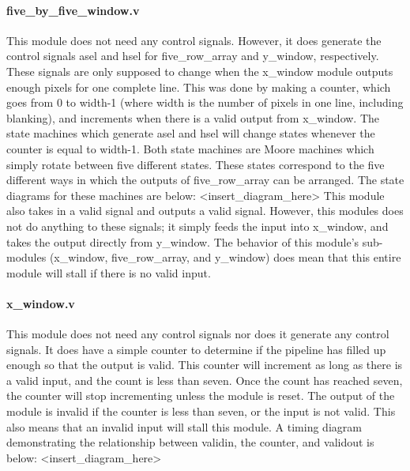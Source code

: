 \documentclass[12pt]{article}
\begin{document}
\paragraph{five\_by\_five\_window.v}
This module does not need any control signals. However, it does generate the 
control signals asel and hsel for five\_row\_array and y\_window, respectively. 
These signals are only supposed to change when the x\_window module outputs 
enough pixels for one complete line. This was done by making a counter, which 
goes from 0 to width-1 (where width is the number of pixels in one line, 
including blanking), and increments when there is a valid output from x\_window. 
The state machines which generate asel and hsel will change states whenever the 
counter is equal to width-1. Both state machines are Moore machines which simply 
rotate between five different states. These states correspond to the five 
different ways in which the outputs of five\_row\_array can be arranged. The state 
diagrams for these machines are below: <insert\_diagram\_here>
This module also takes in a valid signal and outputs a valid signal. However, 
this modules does not do anything to these signals; it simply feeds the input 
into x\_window, and takes the output directly from y\_window. The behavior of this 
module's sub-modules (x\_window, five\_row\_array, and y\_window) does mean that 
this entire module will stall if there is no valid input.

\paragraph{x\_window.v}
This module does not need any control signals nor does it generate any control 
signals. It does have a simple counter to determine if the pipeline has filled 
up enough so that the output is valid. This counter will increment as long as 
there is a valid input, and the count is less than seven. Once the count has 
reached seven, the counter will stop incrementing unless the module is reset. 
The output of the module is invalid if the counter is less than seven, or the 
input is not valid. This also means that an invalid input will stall this 
module. A timing diagram demonstrating the relationship between validin, the 
counter, and validout is below: <insert\_diagram\_here>
\end{document}

